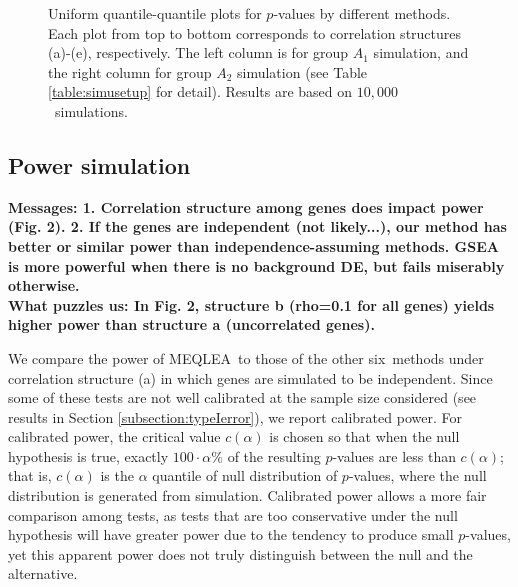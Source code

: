 \documentclass[a4,center,fleqn]{NAR}
\newcommand{\OurMethod}{MEQLEA}
\newcommand{\HowmanyTest}{six}
\newcommand{\aaCase}{a}
\newcommand{\fCase}{e}
\newcommand{\HowmanySimu}{$10,000$}
\begin{document}
\begin{figure}[!ht]
\begin{center}
		\end{center} 
		\caption{Uniform quantile-quantile plots for $p$-values by different methods. Each plot from top to
			bottom corresponds to correlation structures (\aaCase)-(\fCase), respectively. The left column is
			for group $A_1$ simulation, and the right column for group $A_2$ simulation (see Table
			\ref{table:simusetup} for detail). Results are based on
			\HowmanySimu~simulations.}\label{fig:typeIerror}
	\end{figure} 
	
	
	\subsection{Power simulation}\label{subsection:power}		 
	
\textbf{	Messages: 1. Correlation structure among genes does impact power (Fig. 2). 2. If the genes are independent (not likely...), our method has better or similar power than independence-assuming methods. GSEA is more powerful when there is no background DE, but fails miserably otherwise. \\
	What puzzles us: In Fig. 2, structure b (rho=0.1 for all genes) yields higher power than structure a (uncorrelated genes).}
	
	
	We compare the power of \OurMethod~to those of the other \HowmanyTest~methods under correlation structure (\aaCase)
	in which genes are simulated to be independent. 
	Since some of these tests are not well calibrated at the sample size
	considered (see results in Section \ref{subsection:typeIerror}), we report calibrated power. For
	calibrated power, the critical value $c(\alpha)$ is chosen so that when the null hypothesis is true,
	exactly $100\cdot\alpha\%$ of the resulting $p$-values are less than $c(\alpha)$; that is,
	$c(\alpha)$ is  the $\alpha$ quantile of null distribution of $p$-values, where the null
	distribution is generated from simulation. Calibrated power allows a more fair comparison among
	tests, as tests that are too conservative under the null hypothesis will have greater power due to
	the tendency to produce small $p$-values, yet this apparent power does not truly distinguish between
	the null and the alternative.  
	
\end{document}
